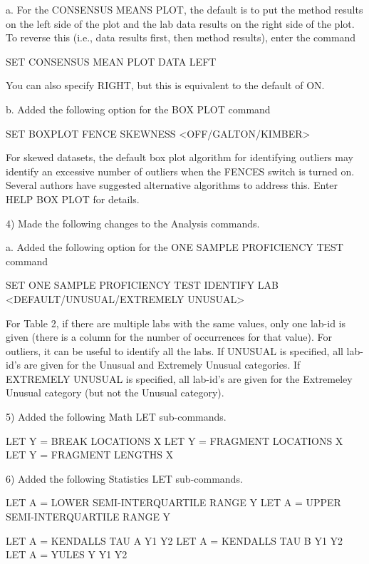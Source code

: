       a. For the CONSENSUS MEANS PLOT, the default is to put the method
         results on the left side of the plot and the lab data results
         on the right side of the plot.  To reverse this (i.e., data
         results first, then method results), enter the command

            SET CONSENSUS MEAN PLOT DATA LEFT

         You can also specify RIGHT, but this is equivalent to the
         default of ON.

      b. Added the following option for the BOX PLOT command

            SET BOXPLOT FENCE SKEWNESS <OFF/GALTON/KIMBER>

         For skewed datasets, the default box plot algorithm for
         identifying outliers may identify an excessive number of
         outliers when the FENCES switch is turned on.  Several
         authors have suggested alternative algorithms to address
         this.  Enter HELP BOX PLOT for details.

 4) Made the following changes to the Analysis commands.

      a. Added the following option for the ONE SAMPLE PROFICIENCY TEST
         command

            SET ONE SAMPLE PROFICIENCY TEST IDENTIFY LAB
                <DEFAULT/UNUSUAL/EXTREMELY UNUSUAL>

         For Table 2, if there are multiple labs with the same values,
         only one lab-id is given (there is a column for the number of
         occurrences for that value).  For outliers, it can be useful
         to identify all the labs.  If UNUSUAL is specified, all lab-id's
         are given for the Unusual and Extremely Unusual categories.  If
         EXTREMELY UNUSUAL is specified, all lab-id's are given for the
         Extremeley Unusual category (but not the Unusual category).

 5) Added the following Math LET sub-commands.

      LET Y = BREAK LOCATIONS X
      LET Y = FRAGMENT LOCATIONS X
      LET Y = FRAGMENT LENGTHS X

 6) Added the following Statistics LET sub-commands.

      LET A = LOWER SEMI-INTERQUARTILE RANGE Y
      LET A = UPPER SEMI-INTERQUARTILE RANGE Y

      LET A = KENDALLS TAU A  Y1 Y2
      LET A = KENDALLS TAU B  Y1 Y2
      LET A = YULES Y  Y1 Y2

